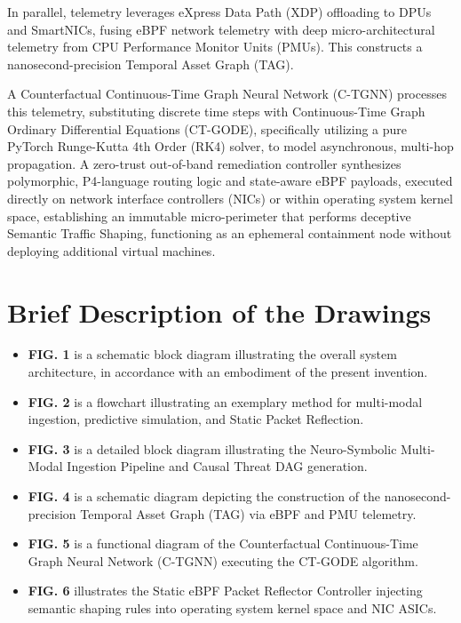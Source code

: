 \documentclass[12pt, letterpaper]{article}
\begin{document}
In parallel, telemetry leverages eXpress Data Path (XDP) offloading to DPUs and SmartNICs, fusing eBPF network telemetry with deep micro-architectural telemetry from CPU Performance Monitor Units (PMUs). This constructs a nanosecond-precision Temporal Asset Graph (TAG).

A Counterfactual Continuous-Time Graph Neural Network (C-TGNN) processes this telemetry, substituting discrete time steps with Continuous-Time Graph Ordinary Differential Equations (CT-GODE), specifically utilizing a pure PyTorch Runge-Kutta 4th Order (RK4) solver, to model asynchronous, multi-hop propagation. A zero-trust out-of-band remediation controller synthesizes polymorphic, P4-language routing logic and state-aware eBPF payloads, executed directly on network interface controllers (NICs) or within operating system kernel space, establishing an immutable micro-perimeter that performs deceptive Semantic Traffic Shaping, functioning as an ephemeral containment node without deploying additional virtual machines.

\section{Brief Description of the Drawings}
\begin{itemize}
    \item \textbf{FIG. 1} is a schematic block diagram illustrating the overall system architecture, in accordance with an embodiment of the present invention.
    \item \textbf{FIG. 2} is a flowchart illustrating an exemplary method for multi-modal ingestion, predictive simulation, and Static Packet Reflection.
    \item \textbf{FIG. 3} is a detailed block diagram illustrating the Neuro-Symbolic Multi-Modal Ingestion Pipeline and Causal Threat DAG generation.
    \item \textbf{FIG. 4} is a schematic diagram depicting the construction of the nanosecond-precision Temporal Asset Graph (TAG) via eBPF and PMU telemetry.
    \item \textbf{FIG. 5} is a functional diagram of the Counterfactual Continuous-Time Graph Neural Network (C-TGNN) executing the CT-GODE algorithm.
    \item \textbf{FIG. 6} illustrates the Static eBPF Packet Reflector Controller injecting semantic shaping rules into operating system kernel space and NIC ASICs.
\end{itemize}
\end{document}
